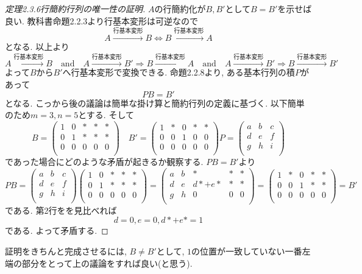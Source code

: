 \documentclass[dvipdfmx,a4paper,11pt]{article} %
\theoremstyle{definition}
\begin{document}
\begin{proof}[定理2.3.6行簡約行列の唯一性の証明]
$A$の行簡約化が$B, B'$として$B=B'$を示せば良い.
教科書命題2.2.3より行基本変形は可逆なので
$$
 A \overset{\text{行基本変形}}{\longrightarrow} B 
\Leftrightarrow 
B  \overset{\text{行基本変形}}{\longrightarrow} A
$$
となる. 
以上より
$$
 A \overset{\text{行基本変形}}{\longrightarrow} B 
  \quad\text{and}\quad 
   A \overset{\text{行基本変形}}{\longrightarrow} B'
   \Rightarrow 
B  \overset{\text{行基本変形}}{\longrightarrow} A   
  \quad\text{and}\quad 
     A \overset{\text{行基本変形}}{\longrightarrow} B'
\Rightarrow 
B  \overset{\text{行基本変形}}{\longrightarrow} B'   
$$
よって$B$から$B'$へ行基本変形で変換できる. 
命題2.2.8より, ある基本行列の積$P$があって
$$
PB=B'
$$
となる. 
こっから後の議論は簡単な掛け算と簡約行列の定義に基づく. 
以下簡単のため$m=3, n=5$とする. 
そして
$$
B=
\begin{pmatrix}
 1&  0&  \ast &  \ast& \ast\\
0 &  1 &  \ast&  \ast& \ast\\
0 &  0 &  0&0 & 0\\
 \end{pmatrix}
 \quad
 B'=
\begin{pmatrix}
 1&  \ast&  0 &  \ast& \ast\\
0 &  0 &  1&0 & 0\\
0 &  0 &  0&0 & 0\\
 \end{pmatrix}
 P=
\begin{pmatrix}
a&  b &c\\
d&  e &f\\
g&  h &i\\
 \end{pmatrix}
$$
であった場合にどのような矛盾が起きるか観察する. 
$PB=B'$より
$$
PB
=
\begin{pmatrix}
a&  b &c\\
d&  e &f\\
g&  h &i\\
 \end{pmatrix}
\begin{pmatrix}
 1&  0&  \ast &  \ast& \ast\\
0 &  1 &  \ast&  \ast& \ast\\
0 &  0 &  0&0 & 0\\
 \end{pmatrix}
 =
 \begin{pmatrix}
 a& b& \ast&  \ast& \ast\\
d &  e &  d\ast + e \ast &  \ast& \ast\\
g &  h &  0&0 & 0\\
 \end{pmatrix}
 =
 \begin{pmatrix}
 1&  \ast&  0 &  \ast& \ast\\
0 &   0&  1&  \ast& \ast\\
0 &  0 &  0&0 & 0\\
 \end{pmatrix}
 =
 B'
$$
である. 
第2行をを見比べれば
$$
d=0, e=0, d\ast + e\ast = 1 
$$
である. よって矛盾する. 
\end{proof}
証明をきちんと完成させるには, $B\neq B'$として, $1$の位置が一致していない一番左端の部分をとって上の議論をすれば良い(と思う).
\end{document}
